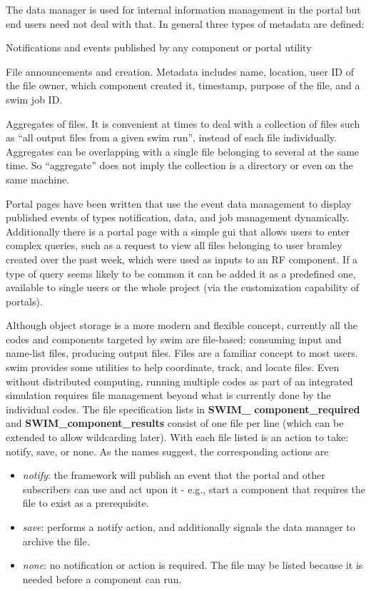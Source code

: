 The data manager is used for internal information management in the portal
but end users need not deal with that.  In general three types of metadata
are defined:
        \begin{enumerator}
        \item Notifications and events published by any component or portal utility
        \item File announcements and creation. Metadata includes name, location,
              user ID of the file owner, which component created it, timestamp,
              purpose of the file, and a \ac{swim} job ID.
        \item Aggregates of files. It is convenient at times to deal with a
              collection of files such as ``all output files from a given \ac{swim}
              run'', instead of each file individually. Aggregates can be
              overlapping with a single file belonging to several at the same
              time. So ``aggregate'' does not imply the collection is a
              directory or even on the same machine.
        \end{enumerator}
        
Portal pages have been written that use the event data management to
display published events of types notification, data, and job management
dynamically. Additionally there is a portal page with a simple \ac{gui} that allows
users to enter complex queries, such as a request to view all files
belonging to user bramley created over the past week, which were used as
inputs to an RF component. If a type of query seems likely to be common
it can be added it as a predefined one, available to single users or the
whole project (via the customization capability of portals).
    
Although object storage is a more modern and flexible concept, currently
all the codes and components targeted by \ac{swim} are file-based: consuming
input and name-list files, producing output files. Files are a familiar
concept to most users. \ac{swim} provides some utilities to help coordinate,
track, and locate files.  Even without distributed computing, running
multiple codes as part of an integrated simulation requires file management
beyond what is currently done by the individual codes. The file
specification lists in {\bf SWIM\_ component\_required} and
{\bf SWIM\_component\_results}
consist of one file per line (which can be extended to allow wildcarding
later). With each file listed is an action to take: notify, save, or none.
As the names suggest, the corresponding actions are
\begin{itemize}
    \item {\em notify}: the framework will publish an event that the portal and other
          subscribers can use and act upon it - e.g., start a component that
          requires the file to exist as a prerequisite. 
    \item {\em save}: performs a notify action, and additionally signals the data
          manager to archive the file.
    \item {\em none}: no notification or action is required. The file may be listed
          because it is needed before a component can run.
\end{itemize}
